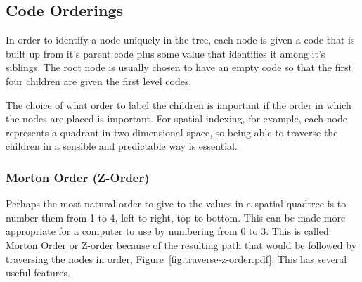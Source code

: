 \subsection{Code Orderings}
\label{sub:code_orderings}

In order to identify a node uniquely in the tree, each node is given a code
that is built up from it's parent code plus some value that identifies it
among it's siblings. The root node is usually chosen to have an empty code so
that the first four children are given the first level codes.

The choice of what order to label the children is important if the order
in which the nodes are placed is important. For spatial indexing, for example,
each node represents a quadrant in two dimensional space, so being able to
traverse the children in a sensible and predictable way is essential.

\subsubsection[Morton Order]{Morton Order (Z-Order)}
\label{ssub:morton_code_z_order_}

Perhaps the most natural order to give to the values in a spatial quadtree is
to number them from 1 to 4, left to right, top to bottom. This can be made
more appropriate for a computer to use by numbering from 0 to 3. This is
called Morton Order\cite{mortoncomputer} or Z-order because of the resulting
path that would be followed by traversing the nodes in order,
Figure~\ref{fig:traverse-z-order.pdf}. This has several useful features.

